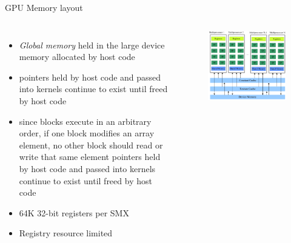 \documentclass[10pt,times]{beamer}
\begin{document}
\begin{frame}{GPU Memory layout}
\begin{columns}
\begin{itemize}
\item \textit{Global memory} held in the large device memory allocated by host code
\item pointers held by host code and passed into kernels continue to exist until
freed by host code
\item since blocks execute in an arbitrary order, if one block modifies an array
element, no other block should read or write that same element pointers held by host 
code and passed into kernels continue to exist until freed by host code
\item 64K 32-bit registers per SMX
\item Registry resource limited
\end{itemize}
\begin{figure}
\includegraphics[width=\linewidth]{figs/GPU_Memory_layout.png}
\end{figure}

\end{columns}

\end{frame}
\end{document}
